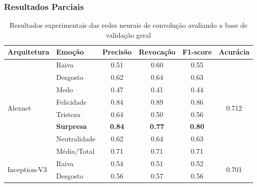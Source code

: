 \documentclass{beamer}
\begin{document}
\begin{frame}
 \frametitle{Resultados Parciais}
\begin{table}[]
\tiny
\centering
\caption{Resultados experimentais das redes neurais de convolução avaliando a base de validação geral}
\label{table:resultsexp}
\begin{tabular}{llcccc}
\hline
\textbf{Arquitetura}                & \textbf{Emoção}       & \textbf{Precisão} & \textbf{Revocação} & \textbf{F1-score} & \textbf{Acurácia}               \\ \hline
\multirow{8}{*}{Alexnet}            & Raiva                 & 0.51              & 0.60               & 0.55              & \multirow{8}{*}{0.712}          \\
                                    & Desgosto              & 0.62              & 0.64               & 0.63              &                                 \\
                                    & Medo                  & 0.47              & 0.41               & 0.44              &                                 \\
                                    & Felicidade            & 0.84              & 0.89               & 0.86              &                                 \\
                                    & Tristeza              & 0.64              & 0.50               & 0.56              &                                 \\
                                    & \scriptsize \textbf{Surpresa}              & \scriptsize \textbf{0.84}              & \scriptsize \textbf{0.77}               & \scriptsize \textbf{0.80}              &                                 \\
                                    & Neutralidade          & 0.62              & 0.64               & 0.63              &                                 \\
                                    & Média/Total           & 0.71              & 0.71               & 0.71              &                                 \\ \hline
\multirow{8}{*}{Inception-V3}       & Raiva                 & 0.54              & 0.51               & 0.52              & \multirow{8}{*}{0.701}          \\
                                    & Desgosto              & 0.56              & 0.57               & 0.56              &                                 \\

\end{tabular}
\end{table}
\end{frame}
\end{document}
